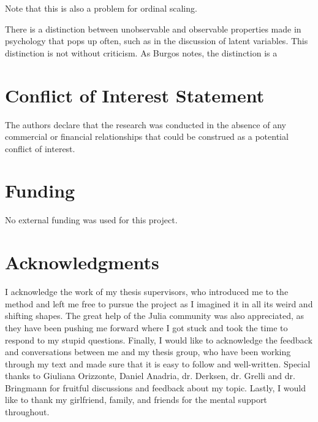 \documentclass[utf8]{FrontiersinVancouver}
\begin{document}
Note that this is also a problem for ordinal scaling. 

There is a distinction between unobservable and observable properties made in psychology that pops up often, such as in the discussion of latent variables. This distinction is not without criticism. As Burgos notes, the distinction is a \citep{burgosRealProblemHypothetical2021}





\section*{Conflict of Interest Statement}
The authors declare that the research was conducted in the absence of any commercial or financial relationships that could be construed as a potential conflict of interest.

\section*{Funding}
No external funding was used for this project.

\section*{Acknowledgments}
I acknowledge the work of my thesis supervisors, who introduced me to the method and left me free to pursue the project as I imagined it in all its weird and shifting shapes.  The great help of the Julia community was also appreciated, as they have been pushing me forward where I got stuck and took the time to respond to my stupid questions. Finally, I would like to acknowledge the feedback and conversations between me and my thesis group, who have been working through my text and made sure that it is easy to follow and well-written. Special thanks to Giuliana Orizzonte, Daniel Anadria, dr. Derksen, dr. Grelli and dr. Bringmann for fruitful discussions and feedback about my topic. Lastly, I would like to thank my girlfriend, family, and friends for the mental support throughout.
\end{document}
